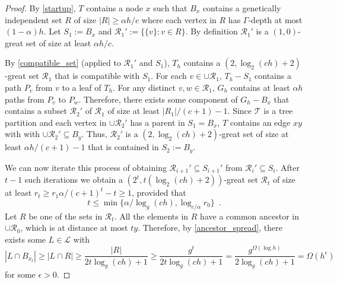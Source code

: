 \documentclass{patmorin}
\begin{document}
\begin{proof}
  By \cref{startup}, $T$ contains a node $x$ such that $B_x$ contains a genetically independent set $R$ of size $|R|\ge \alpha h/c$ where each vertex in $R$ has $\Gamma$-depth at most $(1-\alpha)h$.  Let $S_1:=B_x$ and $\mathcal{R}_1':=\{\{v\}:v\in R\}$.  By definition $\mathcal{R}_1'$ is a $(1,0)$-great set of size at least $\alpha h/c$.

  By \cref{compatible_set} (applied to $\mathcal{R}_1'$ and $S_1$), $T_h$ contains a $(2,\log_2(ch)+2)$-great set $\mathcal{R}_1$ that is compatible with $S_1$.
  For each $v\in\cup\mathcal{R}_1$, $T_h-S_1$ contains a path $P_v$ from $v$ to a leaf of $T_h$.  For any distinct $v,w\in\mathcal{R}_1$, $G_h$ contains at least $\alpha h$ paths from $P_v$ to $P_w$.  Therefore, there exists some component of $G_h-B_x$ that contains a subset $\mathcal{R}_2'$ of $\mathcal{R}_1$ of size at least $|R_1|/(c+1) - 1$.  Since $\mathcal{T}$ is a tree partition and each vertex in $\cup\mathcal{R}_2'$ has a parent in $S_1=B_x$, $T$ contains an edge $xy$ with with $\cup\mathcal{R}_2'\subseteq B_y$.  Thus, $\mathcal{R}_2'$ is a $(2,\log_2(ch)+2)$-great set of size at least $\alpha h/(c+1)-1$ that is contained in $S_2:=B_y$.

  We can now iterate this process of obtaining $\mathcal{R}_{i+1}'\subseteq S_{i+1}'$ from $\mathcal{R}_i'\subseteq S_i$.  After $t-1$ such iterations we obtain a $(2^t,t(\log_2(ch)+2))$-great set $\mathcal{R}_t$ of size at least $r_t \ge r_1\alpha/(c+1)^t-t \ge 1$, provided that 
  \[
    t \le \min\{\alpha/\log_g(ch), \log_{c/\alpha} r_0\} \enspace .
  \]
  Let $R$ be one of the sets in $\mathcal{R}_t$.  All the elements in $R$ have a common ancestor in $\cup\mathcal{R}_0$, which is at distance at most $ty$.  Therefore, by \cref{ancestor_spread}, there exists some $L\in\mathcal{L}$ with
  \[
    |L\cap B_{x_t}|\ge |L\cap R| \ge \frac{|R|}{2t\log_g(ch)+1} 
    \ge \frac{g^t}{2t\log_g(ch)+1}
    = \frac{g^{\Omega(\log h)}}{2\log_g(ch)+1}
    = \Omega(h^\epsilon) 
  \] 
  for some $\epsilon >0$.
\end{proof}



\end{document}
